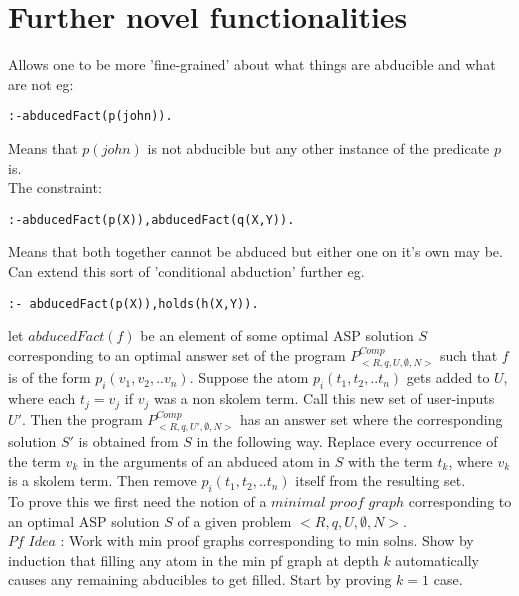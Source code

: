 \documentclass{article}
\begin{document}
\section{Further novel functionalities}
Allows one to be more 'fine-grained' about what things are abducible and what are not eg:
\begin{verbatim}
:-abducedFact(p(john)).    
\end{verbatim}
Means that $p(john)$ is not abducible but any other instance of the predicate $p$ is.\\
\newline
The constraint:
\begin{verbatim}
:-abducedFact(p(X)),abducedFact(q(X,Y)).
\end{verbatim}
Means that both together cannot be abduced but either one on it's own may be. Can extend this sort of 'conditional abduction' further eg.
\begin{verbatim}
:- abducedFact(p(X)),holds(h(X,Y)).  
\end{verbatim}


let $abducedFact(f)$ be an element of some optimal ASP solution $S$ corresponding to an optimal answer set of the program $P_{<R,q,U,\emptyset,N>}^{Comp}$ such that $f$ is of the form $p_{i}(v_{1},v_{2},..v_{n})$. Suppose the atom $p_{i}(t_{1},t_{2},..t_{n})$ gets added to $U$, where each $t_{j} = v_{j}$ if $v_{j}$ was a non skolem term. Call this new set of user-inputs $U'$. Then the program $P_{<R,q,U',\emptyset,N>}^{Comp}$ has an answer set where the corresponding solution $S'$ is obtained from $S$ in the following way. Replace every occurrence of the term $v_{k}$ in the arguments of an abduced atom in $S$ with the term $t_{k}$, where $v_{k}$ is a skolem term. Then remove $p_{i}(t_{1},t_{2},..t_{n})$ itself from the resulting set.\\
\newline
To prove this we first need the notion of a $minimal$ $proof$ $graph$ corresponding to an optimal ASP solution $S$ of a given problem $<R,q,U,\emptyset,N>$. \\
\newline
$\textit{Pf Idea}$ : Work with min proof graphs corresponding to min solns. Show by induction that filling any atom in the min pf graph at depth $k$ automatically causes any remaining abducibles to get filled. Start by proving $k=1$ case.
\end{document}
